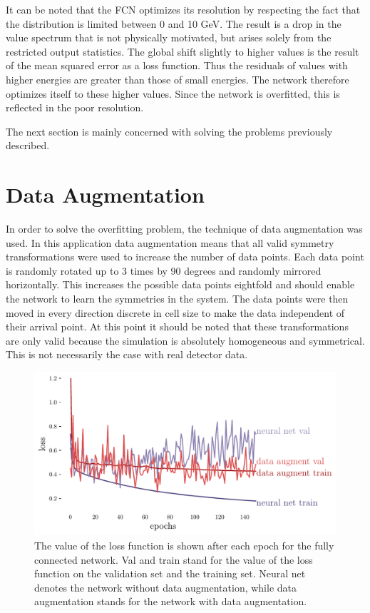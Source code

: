 \documentclass[12pt, a4paper]{thesis}
\begin{document}
It can be noted that the FCN optimizes its resolution by respecting
the fact that the distribution is limited between 0 and 10 GeV. The
result is a drop in the value spectrum that is not physically
motivated, but arises solely from the restricted output statistics.
The global shift slightly to higher values is the result of the mean
squared error as a loss function. Thus the residuals of values with
higher energies are greater than those of small energies. The network
therefore optimizes itself to these higher values. Since the network
is overfitted, this is reflected in the poor resolution.

The next section is mainly concerned with solving the problems previously
described.

\section{Data Augmentation}
\label{sec:org4a347fb}

In order to solve the overfitting problem, the technique of data
augmentation was used. In this application data augmentation means
that all valid symmetry transformations were used to increase the
number of data points. Each data point is randomly rotated up to 3
times by 90 degrees and randomly mirrored horizontally. This increases
the possible data points eightfold and should enable the network to
learn the symmetries in the system. The data points were then moved in
every direction discrete in cell size to make the data independent of
their arrival point. At this point it should be noted that these
transformations are only valid because the simulation is absolutely
homogeneous and symmetrical. This is not necessarily the case with
real detector data.

\begin{figure}[H]
  \centering
  \includegraphics[width=.9\linewidth]{../images/data_augment_loss.pdf}
  \caption{The value of the loss function is shown after each epoch
    for the fully connected network. Val and train stand for the value
    of the loss function on the validation set and the training
    set. Neural net denotes the network without data augmentation,
    while data augmentation stands for the network with data
    augmentation.}
  \label{da_loss}
\end{figure} 
\end{document}
